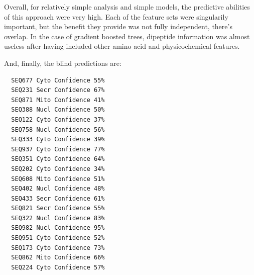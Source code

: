 \documentclass{bioinfo}
\begin{document}
Overall, for relatively simple analysis and simple models, the predictive abilities of this approach were very high.
Each of the feature sets were singularily important, but the benefit they provide was not fully independent, there's overlap.
In the case of gradient boosted trees, dipeptide information was almost useless after having included other amino acid and physicochemical features.

And, finally, the blind predictions are:
\begin{lstlisting}
  SEQ677 Cyto Confidence 55% 
  SEQ231 Secr Confidence 67% 
  SEQ871 Mito Confidence 41% 
  SEQ388 Nucl Confidence 50% 
  SEQ122 Cyto Confidence 37% 
  SEQ758 Nucl Confidence 56% 
  SEQ333 Cyto Confidence 39% 
  SEQ937 Cyto Confidence 77% 
  SEQ351 Cyto Confidence 64% 
  SEQ202 Cyto Confidence 34% 
  SEQ608 Mito Confidence 51% 
  SEQ402 Nucl Confidence 48% 
  SEQ433 Secr Confidence 61% 
  SEQ821 Secr Confidence 55% 
  SEQ322 Nucl Confidence 83% 
  SEQ982 Nucl Confidence 95% 
  SEQ951 Cyto Confidence 52% 
  SEQ173 Cyto Confidence 73% 
  SEQ862 Mito Confidence 66% 
  SEQ224 Cyto Confidence 57% 
\end{lstlisting}


\end{document}
